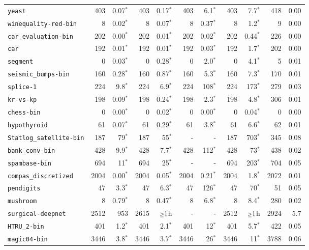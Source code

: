 \begin{tabular}{lrrrrrrrrrr}
\texttt{yeast} & 403 & 0.07$^*$ & 403 & 0.17$^*$ & 403 & 6.1$^*$ & 403 & 7.7$^*$ & 418 & 0.00\\
\texttt{winequality-red-bin} & 8 & 0.02$^*$ & 8 & 0.07$^*$ & 8 & 0.37$^*$ & 8 & 1.2$^*$ & 9 & 0.00\\
\texttt{car\_evaluation-bin} & 202 & 0.00$^*$ & 202 & 0.01$^*$ & 202 & 0.02$^*$ & 202 & 0.44$^*$ & 226 & 0.00\\
\texttt{car} & 192 & 0.01$^*$ & 192 & 0.01$^*$ & 192 & 0.03$^*$ & 192 & 1.7$^*$ & 202 & 0.00\\
\texttt{segment} & 0 & 0.03$^*$ & 0 & 0.28$^*$ & 0 & 2.0$^*$ & 0 & 4.1$^*$ & 5 & 0.01\\
\texttt{seismic\_bumps-bin} & 160 & 0.28$^*$ & 160 & 0.87$^*$ & 160 & 5.3$^*$ & 160 & 7.3$^*$ & 170 & 0.01\\
\texttt{splice-1} & 224 & 9.8$^*$ & 224 & 6.9$^*$ & 224 & 108$^*$ & 224 & 173$^*$ & 279 & 0.03\\
\texttt{kr-vs-kp} & 198 & 0.09$^*$ & 198 & 0.24$^*$ & 198 & 2.3$^*$ & 198 & 4.8$^*$ & 306 & 0.01\\
\texttt{chess-bin} & 0 & 0.00$^*$ & 0 & 0.02$^*$ & 0 & 0.00$^*$ & 0 & 0.04$^*$ & 0 & 0.00\\
\texttt{hypothyroid} & 61 & 0.07$^*$ & 61 & 0.29$^*$ & 61 & 3.8$^*$ & 61 & 6.6$^*$ & 62 & 0.01\\
\texttt{Statlog\_satellite-bin} & 187 & 79$^*$ & 187 & 55$^*$ & - & - & 187 & 703$^*$ & 345 & 0.08\\
\texttt{bank\_conv-bin} & 428 & 9.9$^*$ & 428 & 7.7$^*$ & 428 & 112$^*$ & 428 & 73$^*$ & 438 & 0.02\\
\texttt{spambase-bin} & 694 & 11$^*$ & 694 & 25$^*$ & - & - & 694 & 203$^*$ & 704 & 0.05\\
\texttt{compas\_discretized} & 2004 & 0.00$^*$ & 2004 & 0.05$^*$ & 2004 & 0.21$^*$ & 2004 & 1.8$^*$ & 2072 & 0.01\\
\texttt{pendigits} & 47 & 3.3$^*$ & 47 & 6.3$^*$ & 47 & 126$^*$ & 47 & 70$^*$ & 51 & 0.05\\
\texttt{mushroom} & 8 & 0.79$^*$ & 8 & 0.47$^*$ & 8 & 6.8$^*$ & 8 & 8.4$^*$ & 280 & 0.02\\
\texttt{surgical-deepnet} & 2512 & 953 & 2615 & $\mathsmaller{\geq}1$h & - & - & 2512 & $\mathsmaller{\geq}1$h & 2924 & 5.7\\
\texttt{HTRU\_2-bin} & 401 & 1.2$^*$ & 401 & 2.1$^*$ & 401 & 12$^*$ & 401 & 5.7$^*$ & 422 & 0.05\\
\texttt{magic04-bin} & 3446 & 3.8$^*$ & 3446 & 3.7$^*$ & 3446 & 26$^*$ & 3446 & 11$^*$ & 3788 & 0.06\\

\end{tabular}
